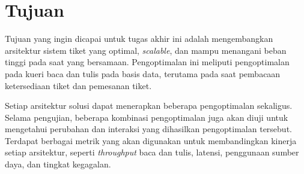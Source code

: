 \section{Tujuan}

Tujuan yang ingin dicapai untuk tugas akhir ini adalah mengembangkan arsitektur sistem tiket yang optimal, \textit{scalable}, dan mampu menangani beban tinggi pada saat yang bersamaan. Pengoptimalan ini meliputi pengoptimalan pada kueri baca dan tulis pada basis data, terutama pada saat pembacaan ketersediaan tiket dan pemesanan tiket.

Setiap arsitektur solusi dapat menerapkan beberapa pengoptimalan sekaligus. Selama pengujian, beberapa kombinasi pengoptimalan juga akan diuji untuk mengetahui perubahan dan interaksi yang dihasilkan pengoptimalan tersebut. Terdapat berbagai metrik yang akan digunakan untuk membandingkan kinerja setiap arsitektur, seperti \textit{throughput} baca dan tulis, latensi, penggunaan sumber daya, dan tingkat kegagalan.
